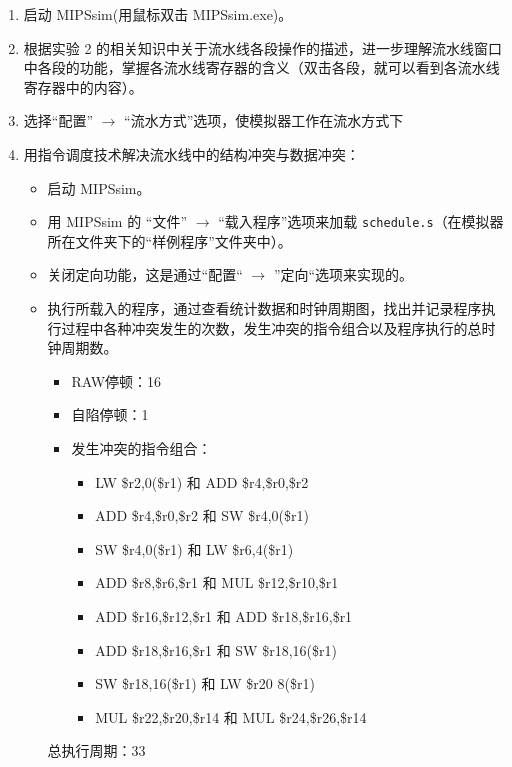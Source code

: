 \documentclass[blue,normal,cn]{elegantnote}
\newcommand{\code}[1]{\colorbox{light-gray}{\texttt{#1}}}
\begin{document}
\begin{enumerate}[wide=0pt, listparindent=2em, parsep=0pt]
  \item 启动 MIPSsim(用鼠标双击 MIPSsim.exe)。
  \item 根据实验 2 的相关知识中关于流水线各段操作的描述，进一步理解流水线窗口中各段的功能，掌握各流水线寄存器的含义（双击各段，就可以看到各流水线寄存器中的内容）。
  \item 选择“配置” $\rightarrow$ “流水方式”选项，使模拟器工作在流水方式下
  \item 用指令调度技术解决流水线中的结构冲突与数据冲突：

        \begin{itemize}[leftmargin=3em, listparindent=2em, parsep=0pt]
          \item 启动 MIPSsim。
          \item 用 MIPSsim 的 “文件” $\rightarrow$ “载入程序”选项来加载 \code{schedule.s}（在模拟器所在文件夹下的“样例程序”文件夹中）。
          \item 关闭定向功能，这是通过“配置“ $\rightarrow$ ”定向“选项来实现的。
          \item  执行所载入的程序，通过查看统计数据和时钟周期图，找出并记录程序执行过程中各种冲突发生的次数，发生冲突的指令组合以及程序执行的总时钟周期数。

                \textcolor{ans}{
                  \begin{itemize}[leftmargin=3em, listparindent=2em, parsep=0pt]
                    \item RAW停顿：16
                    \item 自陷停顿：1
                    \item 发生冲突的指令组合：
                          \begin{itemize}[leftmargin=3em]
                            \item LW \$r2,0(\$r1) 和 ADD \$r4,\$r0,\$r2
                            \item ADD \$r4,\$r0,\$r2 和 SW \$r4,0(\$r1)
                            \item SW \$r4,0(\$r1) 和 LW \$r6,4(\$r1)
                            \item ADD \$r8,\$r6,\$r1 和 MUL \$r12,\$r10,\$r1
                            \item ADD \$r16,\$r12,\$r1 和 ADD \$r18,\$r16,\$r1
                            \item ADD \$r18,\$r16,\$r1 和 SW \$r18,16(\$r1)
                            \item SW \$r18,16(\$r1) 和 LW \$r20 8(\$r1)
                            \item MUL \$r22,\$r20,\$r14 和 MUL \$r24,\$r26,\$r14
                          \end{itemize}
                  \end{itemize}
                }
                \textcolor{ans}{总执行周期：33}


\end{itemize}
\end{enumerate}
\end{document}
